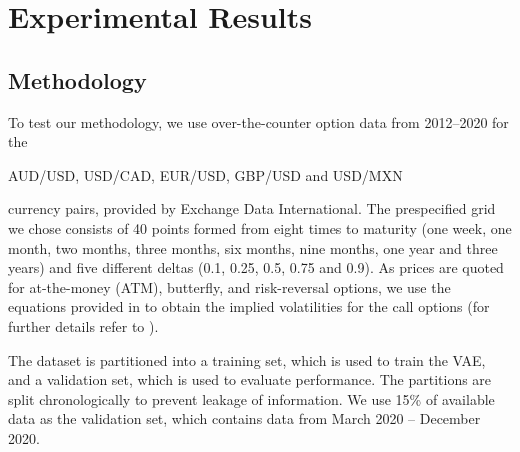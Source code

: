 \documentclass[12pt]{article}
\begin{document}


\section{Experimental Results}
\subsection{Methodology}
To test our methodology, we use over-the-counter option data from 2012--2020 for the \begin{center}\vspace{-1.75em}AUD/USD, USD/CAD, EUR/USD, GBP/USD and USD/MXN\vspace{-1.75em}\end{center} currency pairs, provided by Exchange Data International. The prespecified grid we chose consists of 40 points formed from eight times to maturity (one week, one month, two months, three months, six months, nine months, one year and three years) and five different deltas (0.1, 0.25, 0.5, 0.75 and 0.9). As prices are quoted for at-the-money (ATM), butterfly, and risk-reversal options, we use the equations provided in \citet{wystup} to obtain the implied volatilities for the call options (for further details refer to \citet{clark}).

The dataset is partitioned into a training set, which is used to train the VAE, and a validation set, which is used to evaluate performance. The partitions are split chronologically to prevent leakage of information. We use 15\% of available data as the validation set, which contains data from March 2020 -- December 2020. 
\end{document}
